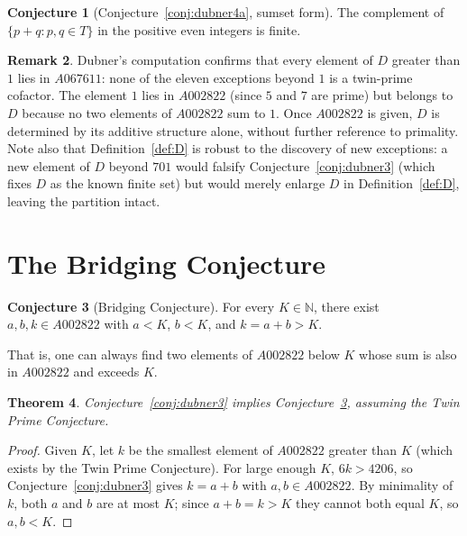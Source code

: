 \documentclass[12pt]{amsart}
\newtheorem{theorem}{Theorem}[section]
\theoremstyle{definition}
\newtheorem{conjecture}[theorem]{Conjecture}
\newtheorem{remark}[theorem]{Remark}
\newcommand{\N}{\mathbb{N}}
\begin{document}
\begin{conjecture}[Conjecture~\ref{conj:dubner4a}, sumset form]
\label{conj:dubner4a-sumset}
The complement of $\{ p + q : p, q \in T \}$ in the positive even integers is finite.
\end{conjecture}

\begin{remark}
\label{rem:D-structure}
Dubner's computation confirms that every element of $D$ greater than $1$ lies in
$A067611$: none of the eleven exceptions beyond $1$ is a twin-prime cofactor. The element
$1$ lies in $A002822$ (since $5$ and $7$ are prime) but belongs to $D$ because no two
elements of $A002822$ sum to $1$. Once $A002822$ is given, $D$ is determined by its
additive structure alone, without further reference to primality. Note also that
Definition~\ref{def:D} is robust to the discovery of new exceptions: a new element of
$D$ beyond $701$ would falsify Conjecture~\ref{conj:dubner3} (which fixes $D$ as the
known finite set) but would merely enlarge $D$ in Definition~\ref{def:D}, leaving the
partition intact.
\end{remark}

\section{The Bridging Conjecture}
\label{sec:bridging}

\begin{conjecture}[Bridging Conjecture]
\label{conj:bridging}
For every $K \in \N$, there exist $a, b, k \in A002822$ with $a < K$, $b < K$, and
$k = a + b > K$.
\end{conjecture}

That is, one can always find two elements of $A002822$ below $K$ whose sum is also in
$A002822$ and exceeds $K$.

\begin{theorem}
\label{thm:dubner-implies-bridging}
Conjecture~\ref{conj:dubner3} implies Conjecture~\ref{conj:bridging}, assuming the Twin
Prime Conjecture.
\end{theorem}

\begin{proof}
Given $K$, let $k$ be the smallest element of $A002822$ greater than $K$ (which exists
by the Twin Prime Conjecture). For large enough $K$, $6k > 4206$, so
Conjecture~\ref{conj:dubner3} gives $k = a + b$ with $a, b \in A002822$. By minimality
of $k$, both $a$ and $b$ are at most $K$; since $a + b = k > K$ they cannot both equal
$K$, so $a, b < K$.
\end{proof}
\end{document}
